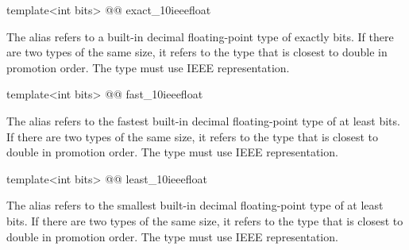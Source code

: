 \begin{addedblock}
\begin{itemdecl}
template<int bits> @@ exact_10ieeefloat
\end{itemdecl}

\begin{itemdescr}
The alias  refers to a built-in decimal floating-point type of exactly  bits. If there are two types of the same size, it refers to the type that is closest to double in promotion order. The type must use IEEE representation.
\end{itemdescr}

\begin{itemdecl}
template<int bits> @@ fast_10ieeefloat
\end{itemdecl}

\begin{itemdescr}
The alias  refers to the fastest built-in decimal floating-point type of at least  bits. If there are two types of the same size, it refers to the type that is closest to double in promotion order. The type must use IEEE representation.
\end{itemdescr}

\begin{itemdecl}
template<int bits> @@ least_10ieeefloat
\end{itemdecl}

\begin{itemdescr}
The alias  refers to the smallest built-in decimal floating-point type of at least  bits. If there are two types of the same size, it refers to the type that is closest to double in promotion order. The type must use IEEE representation.
\end{itemdescr}   
\end{addedblock}
